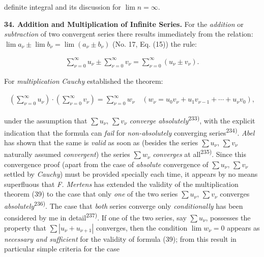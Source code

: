 \thispagestyle{fancy}

\vspace{0.5cm}

definite integral and its discussion for $\lim n = \infty$.

\vspace{0.3cm}
\textbf{34. Addition and Multiplication of Infinite Series.} For the \textit{addition} or \textit{subtraction} of two convergent series there results immediately from the relation: $\lim a_\nu \pm \lim b_\nu = \lim (a_\nu \pm b_\nu)$ (No. 17, Eq. (15)) the rule:

\vspace{-0.5cm}
\begin{align}
    \sum_{\nu=0}^{\infty} u_\nu \pm \sum_{\nu=0}^{\infty} v_\nu = \sum_{\nu=0}^{\infty} (u_\nu \pm v_\nu).
\end{align}

For \textit{multiplication} \textit{Cauchy} established the theorem:

\vspace{-0.5cm}
\begin{align}
(\sum_{\nu=0}^{\infty} u_\nu) \cdot (\sum_{\nu=0}^{\infty} v_\nu) = \sum_{\nu=0}^{\infty} w_\nu \quad (w_\nu = u_0 v_\nu + u_1 v_{\nu - 1} + \cdots + u_\nu v_0),
\end{align}

under the assumption that $\sum u_\nu$, $\sum v_\nu$ \textit{converge absolutely}\textsuperscript{233)}, with the explicit indication that the formula can \textit{fail} for \textit{non-absolutely} converging series\textsuperscript{234)}. \textit{Abel} has shown that the same is \textit{valid} as soon as (besides the series $\sum u_\nu$, $\sum v_\nu$ naturally assumed \textit{convergent}) the series $\sum w_\nu$ \textit{converges} at all\textsuperscript{235)}. Since this convergence proof (apart from the case of \textit{absolute} convergence of $\sum u_\nu$, $\sum v_\nu$ settled by \textit{Cauchy}) must be provided specially each time, it appears by no means superfluous that \textit{F. Mertens} has extended the validity of the multiplication theorem (39) to the case that only \textit{one} of the two series $\sum u_\nu$, $\sum v_\nu$ converges \textit{absolutely}\textsuperscript{236)}. The case that \textit{both} series converge only \textit{conditionally} has been considered by me in detail\textsuperscript{237)}. If one of the two series, say $\sum u_\nu$, possesses the property that $\sum |u_\nu + u_{\nu+1}|$ converges, then the condition $\lim w_\nu = 0$ appears as \textit{necessary and sufficient} for the validity of formula (39); from this result in particular simple criteria for the case


